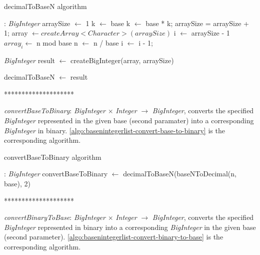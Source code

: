 \documentclass[book, nodocumentinfo]{upmethodology-document}
\newcommand{\separator}{\centerline{********************}}
\begin{document}
\begin{algorithm}[H]
    \caption{decimalToBaseN algorithm}
    \label{algo:basenintegerlist-decimal-to-base}

    \begin{algorithmic}
         : \emph{BigInteger}
            \State arraySize \(\leftarrow\) 1
            \State k \(\leftarrow\) base
                \State k \(\leftarrow\) base * k;
                \State arraySize = arraySize + 1;
            \EndWhile
            \State array \(\leftarrow createArray<Character>(arraySize)\)
            \State i \(\leftarrow\) arraySize - 1
            \Repeat
                \State \(array_{i} \leftarrow \) n mod base
                \State n \(\leftarrow\) n / base
                \State i \(\leftarrow\) i - 1;

            \State \emph{BigInteger} result \(\leftarrow\) createBigInteger(array, arraySize)

            \State decimalToBaseN \(\leftarrow\) result
        \EndFunction
    \end{algorithmic}
\end{algorithm}

\separator

\emph{convertBaseToBinary}: \emph{BigInteger} \(×\) \emph{Integer} \(\rightarrow\) \emph{BigInteger},
converts the specified \emph{BigInteger} represented in the given base (second paramater) into a corresponding \emph{BigInteger}
in binary.
\ref{algo:basenintegerlist-convert-base-to-binary} is the corresponding algorithm.

\begin{algorithm}[H]
    \caption{convertBaseToBinary algorithm}
    \label{algo:basenintegerlist-convert-base-to-binary}

    \begin{algorithmic}
         : \emph{BigInteger}
            \State convertBaseToBinary \(\leftarrow\) decimalToBaseN(baseNToDecimal(n, base), 2)
        \EndFunction
    \end{algorithmic}
\end{algorithm}

\separator

\emph{convertBinaryToBase}: \emph{BigInteger} \(×\) \emph{Integer} \(\rightarrow\) \emph{BigInteger},
converts the specified \emph{BigInteger} represented in binary into a corresponding \emph{BigInteger}
in the given base (second parameter).
\ref{algo:basenintegerlist-convert-binary-to-base} is the corresponding algorithm.
\end{document}
